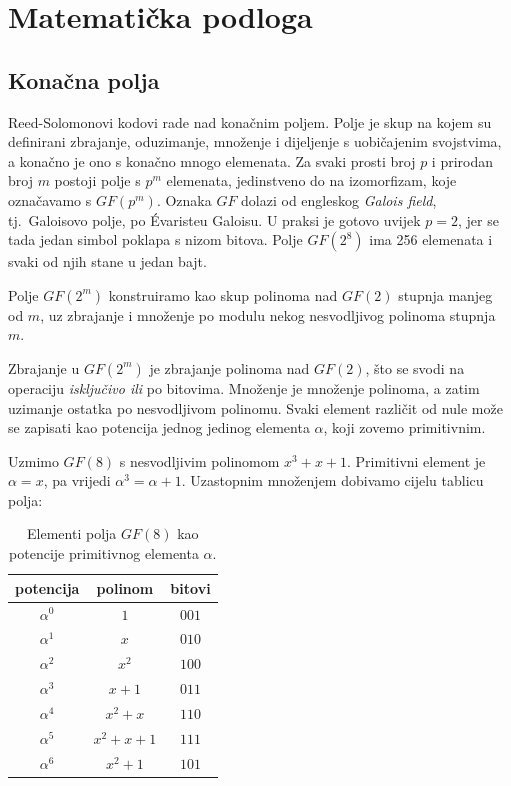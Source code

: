 \documentclass{mathos}
\begin{document}
\chapter{Matematička podloga}\label{podloga}

\section{Konačna polja}

Reed-Solomonovi kodovi rade nad konačnim poljem. Polje je skup na kojem su definirani zbrajanje, oduzimanje, množenje i dijeljenje s uobičajenim svojstvima, a konačno je ono s konačno mnogo elemenata. Za svaki prosti broj $p$ i prirodan broj $m$ postoji polje s $p^m$ elemenata, jedinstveno do na izomorfizam, koje označavamo s $GF(p^m)$. Oznaka $GF$ dolazi od engleskog \emph{Galois field}, tj.\ Galoisovo polje, po Évaristeu Galoisu. U praksi je gotovo uvijek $p = 2$, jer se tada jedan simbol poklapa s nizom bitova. Polje $GF(2^8)$ ima 256 elemenata i svaki od njih stane u jedan bajt.

\begin{defin}
Polje $GF(2^m)$ konstruiramo kao skup polinoma nad $GF(2)$ stupnja manjeg od $m$, uz zbrajanje i množenje po modulu nekog nesvodljivog polinoma stupnja $m$.
\end{defin}

\noindent
Zbrajanje u $GF(2^m)$ je zbrajanje polinoma nad $GF(2)$, što se svodi na operaciju \emph{isključivo ili} po bitovima. Množenje je množenje polinoma, a zatim uzimanje ostatka po nesvodljivom polinomu. Svaki element različit od nule može se zapisati kao potencija jednog jedinog elementa $\alpha$, koji zovemo primitivnim.

\begin{primjer}\label{prim:gf8}
Uzmimo $GF(8)$ s nesvodljivim polinomom $x^3 + x + 1$. Primitivni element je $\alpha = x$, pa vrijedi $\alpha^3 = \alpha + 1$. Uzastopnim množenjem dobivamo cijelu tablicu polja:
\end{primjer}

\begin{table}[hbtp]
\centering
\begin{tabular}{|c|c|c|}\hline
potencija & polinom & bitovi \\\hline
$\alpha^0$ & $1$ & $001$ \\\hline
$\alpha^1$ & $x$ & $010$ \\\hline
$\alpha^2$ & $x^2$ & $100$ \\\hline
$\alpha^3$ & $x+1$ & $011$ \\\hline
$\alpha^4$ & $x^2+x$ & $110$ \\\hline
$\alpha^5$ & $x^2+x+1$ & $111$ \\\hline
$\alpha^6$ & $x^2+1$ & $101$ \\\hline
\end{tabular}
\caption{Elementi polja $GF(8)$ kao potencije primitivnog elementa $\alpha$.}
\label{tab:gf8}
\end{table}
\end{document}
